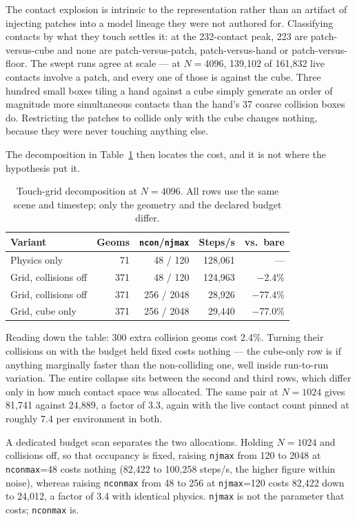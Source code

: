 \documentclass[journal]{IEEEtran}
\begin{document}
The contact explosion is intrinsic to the representation rather than an artifact of injecting patches into a model lineage they were not authored for. Classifying contacts by what they touch settles it: at the 232-contact peak, 223 are patch-versus-cube and none are patch-versus-patch, patch-versus-hand or patch-versus-floor. The swept runs agree at scale --- at $N=4096$, 139{,}102 of 161{,}832 live contacts involve a patch, and every one of those is against the cube. Three hundred small boxes tiling a hand against a cube simply generate an order of magnitude more simultaneous contacts than the hand's 37 coarse collision boxes do. Restricting the patches to collide only with the cube changes nothing, because they were never touching anything else.

The decomposition in Table~\ref{tab:grid} then locates the cost, and it is not where the hypothesis put it.

\begin{table}[t]
\caption{Touch-grid decomposition at $N=4096$. All rows use the same scene and timestep; only the geometry and the declared budget differ.}
\label{tab:grid}
\centering
\small
\begin{tabular}{lrrrr}
\toprule
Variant & Geoms & \texttt{ncon}/\texttt{njmax} & Steps/s & vs.\ bare \\
\midrule
Physics only        & 71  & 48 / 120   & 128,061 & --- \\
Grid, collisions off& 371 & 48 / 120   & 124,963 & $-$2.4\% \\
Grid, collisions off& 371 & 256 / 2048 & 28,926  & $-$77.4\% \\
Grid, cube only     & 371 & 256 / 2048 & 29,440  & $-$77.0\% \\
\bottomrule
\end{tabular}
\end{table}

Reading down the table: 300 extra collision geoms cost 2.4\%. Turning their collisions on with the budget held fixed costs nothing --- the cube-only row is if anything marginally faster than the non-colliding one, well inside run-to-run variation. The entire collapse sits between the second and third rows, which differ only in how much contact space was allocated. The same pair at $N=1024$ gives 81,741 against 24,889, a factor of 3.3, again with the live contact count pinned at roughly 7.4 per environment in both.

A dedicated budget scan separates the two allocations. Holding $N=1024$ and collisions off, so that occupancy is fixed, raising \texttt{njmax} from 120 to 2048 at \texttt{nconmax}=48 costs nothing (82,422 to 100,258 steps/s, the higher figure within noise), whereas raising \texttt{nconmax} from 48 to 256 at \texttt{njmax}=120 costs 82,422 down to 24,012, a factor of 3.4 with identical physics. \texttt{njmax} is not the parameter that costs; \texttt{nconmax} is.
\end{document}
